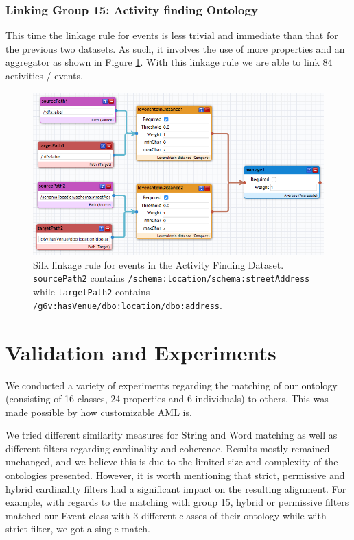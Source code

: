 \documentclass[runningheads,a4paper]{../../StyleFiles/llncs}
\begin{document}
\subsubsection{Linking Group 15: Activity finding Ontology}
\label{link_g15}
This time the linkage rule for events is less trivial and immediate than that for the previous two datasets. As such, it involves the use of more properties and an aggregator as shown in Figure \ref{fig:link_event_g15}. With this linkage rule we are able to link 84 activities / events.

\begin{figure}[h]
	\centering
	\includegraphics[width=1\textwidth]{img/link_event_g15.png}
	\caption{Silk linkage rule for events in the Activity Finding Dataset.
		\texttt{sourcePath2} contains
		\texttt{/schema:location/schema:streetAddress} while
		\texttt{targetPath2} contains
		\texttt{/g6v:hasVenue/dbo:location/dbo:address}.}
	\label{fig:link_event_g15}
\end{figure}

\section{Validation and Experiments}
We conducted a variety of experiments regarding the matching of our ontology (consisting of 16 classes, 24 properties and 6 individuals) to others. This was made possible by how customizable AML is.

We tried different similarity measures for String and Word matching as well as different filters regarding cardinality and coherence. Results mostly remained unchanged, and we believe this is due to the limited size and complexity of the ontologies presented. However, it is worth mentioning that strict, permissive and hybrid cardinality filters had a significant impact on the resulting alignment. For example, with regards to the matching with group 15, hybrid or permissive filters matched our Event class with 3 different classes of their ontology while with strict filter, we got a single match. 
\end{document}
